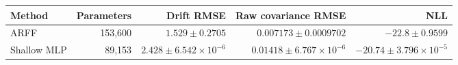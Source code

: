 \begin{tabular}{lrrrr}\toprule Method & Parameters & Drift RMSE & Raw covariance RMSE & NLL\\\midrule
ARFF & 153,600 & $1.529\pm 0.2705$ & $0.007173\pm 0.0009702$ & $-22.8\pm 0.9599$\\
Shallow MLP & 89,153 & $2.428\pm 6.542\times10^{-6}$ & $0.01418\pm 6.767\times10^{-6}$ & $-20.74\pm 3.796\times10^{-5}$\\
\bottomrule\end{tabular}
